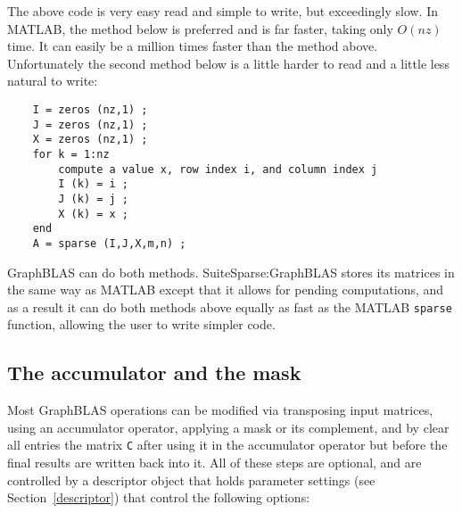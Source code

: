 \documentclass[12pt]{article}
\begin{document}
The above code is very easy read and simple to write, but exceedingly slow.  In
MATLAB, the method below is preferred and is far faster, taking only $O(nz)$
time.  It can easily be a million times faster than the method above.
Unfortunately the second method below is a little harder to read and a little
less natural to write:

    \begin{mdframed}
    {\footnotesize
    \begin{verbatim}
    I = zeros (nz,1) ;
    J = zeros (nz,1) ;
    X = zeros (nz,1) ;
    for k = 1:nz
        compute a value x, row index i, and column index j
        I (k) = i ;
        J (k) = j ;
        X (k) = x ;
    end
    A = sparse (I,J,X,m,n) ;   \end{verbatim}} \end{mdframed}

GraphBLAS can do both methods.  SuiteSparse:GraphBLAS stores its matrices in
the same way as MATLAB except that it allows for pending computations, and as a
result it can do both methods above equally as fast as the MATLAB \verb'sparse'
function, allowing the user to write simpler code.

\subsection{The accumulator and the mask} %
\label{accummask}

Most GraphBLAS operations can be modified via transposing input matrices, using
an accumulator operator, applying a mask or its complement, and by clear all
entries the matrix \verb'C' after using it in the accumulator operator but
before the final results are written back into it.  All of these steps are
optional, and are controlled by a descriptor object that holds parameter
settings (see Section~\ref{descriptor}) that control the following options:
\end{document}

